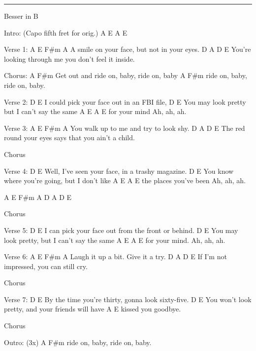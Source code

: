 \noindent\rule{\columnwidth}{1pt}

\begin{multicols}{2}
\begin{lstsong}
Besser in B

Intro: (Capo fifth fret for orig.) A E  A E

Verse 1:
A               E     F#m             A
A smile on your face, but not in your eyes.
D                      A   D                E
You're looking through me you don't feel it inside.

Chorus:
            A              F#m
Get out and ride on, baby, ride on, baby
A              F#m
ride on, baby, ride on, baby.

Verse 2:
        D                        E
I could pick your face out in an FBI file,
    D                     E
You may look pretty but I can't say the same
         A    E            A  E
for your mind      Ah, ah, ah.

Verse 3:
A              E  F#m             A
You walk up to me and try to look shy.
D                  A    D                  E
The red round your eyes says that you ain't a child.

Chorus

Verse 4:
           D                    E
Well, I've seen your face, in a trashy magazine.
    D                                    E
You know where you're going, but I don't like  
                  A    E            A  E       
the places you've been      Ah, ah, ah.


A E F#m A    D A D E


Chorus



Verse 5:
      D                           E
I can pick your face out from the front or behind.
    D                      E
You may look pretty, but I can't say the same
      A   E               A  E
for your mind.   Ah, ah, ah.

Verse 6: 
A             E    F#m       A
Laugh it up a bit. Give it a try.
D            A        D             E
If I'm not impressed, you can still cry.

Chorus

Verse 7:
       D                                    E
By the time you're thirty, gonna look sixty-five.
    D                           E
You won't look pretty, and your friends will have
               A  E
kissed you goodbye.

Chorus

Outro: (3x)
A              F#m
ride on, baby, ride on, baby.
\end{lstsong}
\end{multicols}
\newpage



